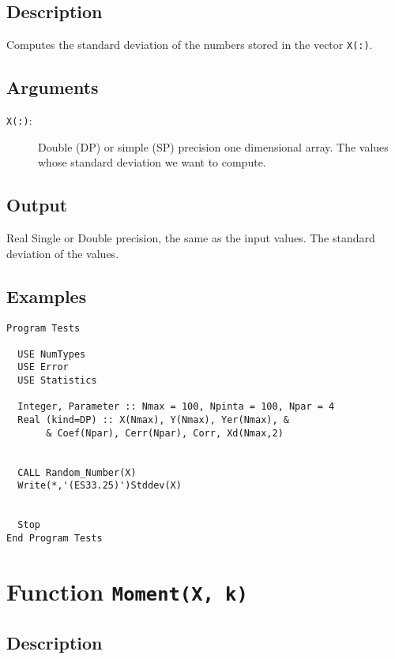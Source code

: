\subsection{Description}

Computes the standard deviation of the numbers stored in the vector
\texttt{X(:)}. 

\subsection{Arguments}

\begin{description}
\item[\texttt{X(:)}:] Double (DP) or simple (SP) precision one
  dimensional array. The values  whose standard deviation we want to
  compute. 
\end{description}

\subsection{Output}

Real Single or Double precision, the same as the input values. The
standard deviation of the values.

\subsection{Examples}

\begin{verbatim}
Program Tests

  USE NumTypes
  USE Error
  USE Statistics

  Integer, Parameter :: Nmax = 100, Npinta = 100, Npar = 4
  Real (kind=DP) :: X(Nmax), Y(Nmax), Yer(Nmax), &
       & Coef(Npar), Cerr(Npar), Corr, Xd(Nmax,2)


  CALL Random_Number(X)
  Write(*,'(ES33.25)')Stddev(X)


  Stop
End Program Tests
\end{verbatim}

\section{Function \texttt{Moment(X, k)}}

\subsection{Description}

